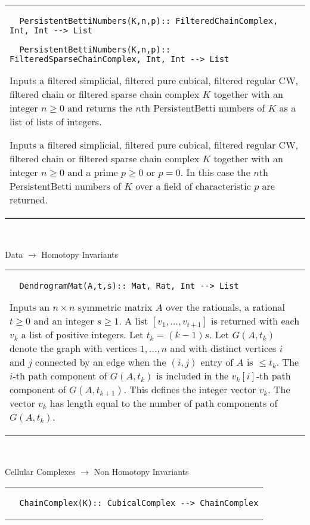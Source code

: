 \documentclass[a4paper,11pt]{report}
\begin{document}
{\begin{center}
\begin{tabular}{|l|}
\begin{verbatim}  PersistentBettiNumbers(K,n,p):: FilteredChainComplex, Int, Int --> List
\end{verbatim}
 
\begin{verbatim}  PersistentBettiNumbers(K,n,p):: FilteredSparseChainComplex, Int, Int --> List
\end{verbatim}
 

Inputs a filtered simplicial, filtered pure cubical, filtered regular CW,
filtered chain or filtered sparse chain complex $K$ together with an integer $n \ge 0$ and returns the $n$th PersistentBetti numbers of $K$ as a list of lists of integers. 

Inputs a filtered simplicial, filtered pure cubical, filtered regular CW,
filtered chain or filtered sparse chain complex $K$ together with an integer $n \ge 0$ and a prime $p \ge 0$ or $p=0$. In this case the $n$th PersistentBetti numbers of $K$ over a field of characteristic $p$ are returned. \\
\end{tabular}\\[2mm]
\end{center}

 Data $\longrightarrow$ Homotopy Invariants \begin{center}
\begin{tabular}{|l|} \index{DendrogramMat} 
\begin{verbatim}  DendrogramMat(A,t,s):: Mat, Rat, Int --> List
\end{verbatim}


 

 Inputs an $n\times n$ symmetric matrix $A$ over the rationals, a rational $t \ge 0$ and an integer $s \ge 1$. A list $[v_1, \ldots, v_{t+1}]$ is returned with each $v_k$ a list of positive integers. Let $t_k = (k-1)s$. Let $G(A,t_k)$ denote the graph with vertices $1, \ldots, n$ and with distinct vertices $i$ and $j$ connected by an edge when the $(i,j)$ entry of $A$ is $\le t_k$. The $i$-th path component of $G(A,t_k)$ is included in the $v_k[i]$-th path component of $G(A,t_{k+1})$. This defines the integer vector $v_k$. The vector $v_k$ has length equal to the number of path components of $G(A,t_k)$. \\
\end{tabular}\\[2mm]
\end{center}

 Cellular Complexes $\longrightarrow$ Non Homotopy Invariants \begin{center}
\begin{tabular}{|l|} \index{ChainComplex} 
\begin{verbatim}  ChainComplex(K):: CubicalComplex --> ChainComplex
\end{verbatim}
 

\end{tabular}
\end{center}}
\end{document}
